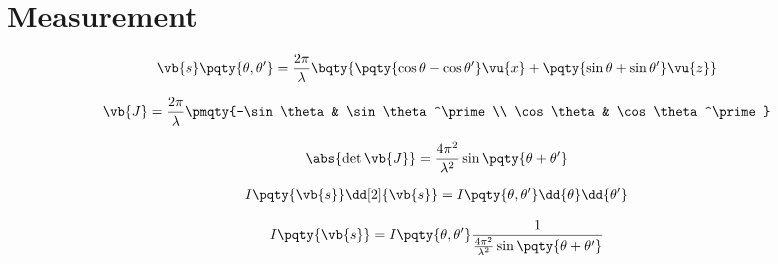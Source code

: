 
\section{Measurement} %
\label{sec:measurement}

\begin{align*}
	\vb{s}\pqty{\theta,\theta^\prime} = \frac{2\pi}{\lambda}\bqty{\pqty{\cos\theta - \cos\theta^\prime}\vu{x} + \pqty{\sin\theta + \sin\theta^\prime}\vu{z}}
\end{align*}

\begin{align*}
	\vb{J} = \frac{2\pi}{\lambda}\pmqty{-\sin\theta & \sin\theta^\prime \\ \cos\theta & \cos\theta^\prime}
\end{align*}

\begin{align*}
	\abs{\det{\vb{J}}} = \frac{4\pi^2}{\lambda^2}\sin\pqty{\theta + \theta^\prime}
\end{align*}

\begin{align*}
	I\pqty{\vb{s}}\dd[2]{\vb{s}} = I\pqty{\theta,\theta^\prime}\dd{\theta}\dd{\theta^\prime}
\end{align*}

\begin{align*}
	I\pqty{\vb{s}} = I\pqty{\theta,\theta^\prime} \frac{1}{\frac{4\pi^2}{\lambda^2}\sin\pqty{\theta + \theta^\prime}}
\end{align*}


